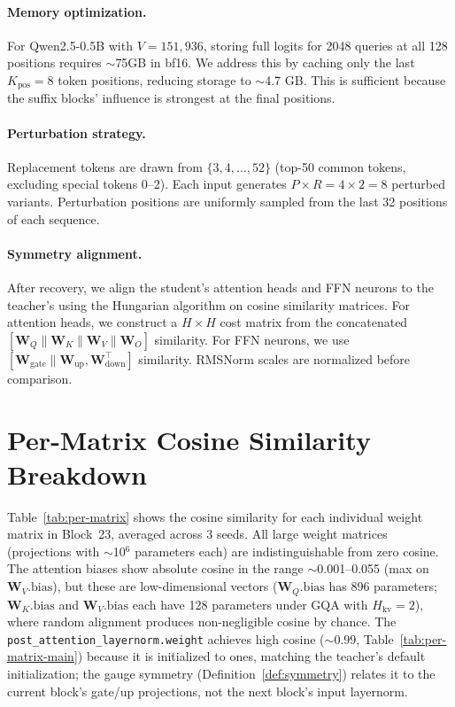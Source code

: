\documentclass{article}
\newcommand{\bW}{\mathbf{W}}
\begin{document}
\paragraph{Memory optimization.}
For Qwen2.5-0.5B with $V = 151{,}936$, storing full logits for 2048 queries at all 128 positions requires $\sim$75GB in bf16. We address this by caching only the last $K_\text{pos} = 8$ token positions, reducing storage to $\sim$4.7 GB. This is sufficient because the suffix blocks' influence is strongest at the final positions.

\paragraph{Perturbation strategy.}
Replacement tokens are drawn from $\{3, 4, \ldots, 52\}$ (top-50 common tokens, excluding special tokens 0--2). Each input generates $P \times R = 4 \times 2 = 8$ perturbed variants. Perturbation positions are uniformly sampled from the last 32 positions of each sequence.

\paragraph{Symmetry alignment.}
After recovery, we align the student's attention heads and FFN neurons to the teacher's using the Hungarian algorithm on cosine similarity matrices. For attention heads, we construct a $H \times H$ cost matrix from the concatenated $[\bW_Q \| \bW_K \| \bW_V \| \bW_O]$ similarity. For FFN neurons, we use $[\bW_\text{gate} \| \bW_\text{up}, \bW_\text{down}^\top]$ similarity. RMSNorm scales are normalized before comparison.


\section{Per-Matrix Cosine Similarity Breakdown}
\label{app:per-matrix}

Table~\ref{tab:per-matrix} shows the cosine similarity for each individual weight matrix in Block~23, averaged across 3 seeds.  All large weight matrices (projections with $\sim$10$^6$ parameters each) are indistinguishable from zero cosine.  The attention biases show absolute cosine in the range $\sim$0.001--0.055 (max on $\bW_V.\text{bias}$), but these are low-dimensional vectors ($\bW_Q.\text{bias}$ has 896 parameters; $\bW_K.\text{bias}$ and $\bW_V.\text{bias}$ each have 128 parameters under GQA with $H_{\text{kv}}{=}2$), where random alignment produces non-negligible cosine by chance.  The \texttt{post\_attention\_layernorm.weight} achieves high cosine ($\sim 0.99$, Table~\ref{tab:per-matrix-main}) because it is initialized to ones, matching the teacher's default initialization; the gauge symmetry (Definition~\ref{def:symmetry}) relates it to the current block's gate/up projections, not the next block's input layernorm.
\end{document}
